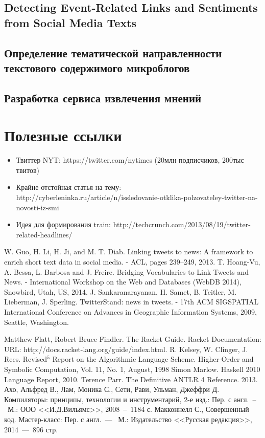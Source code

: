 \documentclass[12pt,a4paper,oneside]{extarticle}
\begin{document}
    \subsection{Detecting Event-Related Links and Sentiments from Social Media Texts}
    \subsection{Определение тематической направленности текстового содержимого микроблогов}
    \subsection{Разработка сервиса извлечения мнений}
    

\section{Полезные ссылки}
    \begin{itemize}
        \item Твиттер NYT: https://twitter.com/nytimes (20млн подписчиков, 200тыс твитов)
        \item Крайне отстойная статья на тему: http://cyberleninka.ru/article/n/issledovanie-otklika-polzovateley-twitter-na-novosti-iz-smi
        \item Идея для формирования train: http://techcrunch.com/2013/08/19/twitter-related-headlines/
    \end{itemize}
\clearpage

\begin{thebibliography}{0}
     W. Guo, H. Li, H. Ji, and M. T. Diab. Linking tweets to news: A framework to enrich short text data in social media. - ACL, pages 239–249, 2013.
     T. Hoang-Vu, A. Bessa, L. Barbosa and J. Freire. Bridging Vocabularies to Link Tweets and News. - International Workshop on the Web and Databases (WebDB 2014), Snowbird, Utah, US, 2014.
     J. Sankaranarayanan, H. Samet, B. Teitler, M. Lieberman, J. Sperling. TwitterStand: news in tweets. - 17th ACM SIGSPATIAL International Conference on Advances in Geographic Information Systems, 2009, Seattle, Washington.

    \hrulefill

     Matthew Flatt, Robert Bruce Findler. The Racket Guide. Racket Documentation: URL: http://docs.racket-lang.org/guide/index.html.
     R. Kelsey, W. Clinger, J. Rees. Revised$^5$ Report on the Algorithmic Language Scheme. Higher-Order and Symbolic Computation, Vol. 11, No. 1, August, 1998
     Simon Marlow. Haskell 2010 Language Report, 2010.
     Terence Parr. The Definitive ANTLR 4 Reference. 2013.
     Ахо, Альфред В., Лам, Моника С., Сети, Рави, Ульман, Джеффри Д. Компиляторы: принципы, технологии и инструментарий, 2-е изд.: Пер. с англ.~--~М.: ООО <<И.Д.Вильямс>>, 2008~--~1184 с.
     Макконнелл С., Совершенный код. Мастер-класс: Пер. с англ.~---~ М.: Издательство <<Русская редакция>>, 2014~---~896 стр.        
\end{thebibliography}
\end{document}
